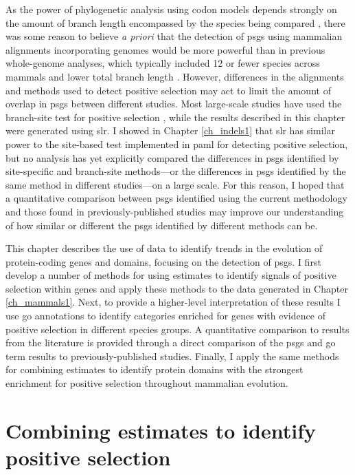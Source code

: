 As the power of phylogenetic analysis using codon models depends
strongly on the amount of branch length encompassed by the species
being compared \citep{Anisimova2001,Anisimova2002}, there was some
reason to believe \emph{a priori} that the detection of \acp{psg}
using mammalian alignments incorporating \lcv genomes would be more
powerful than in previous whole-genome analyses, which typically
included 12 or fewer species across mammals and lower total branch
length \citep{Ellegren2008}. However, differences in the alignments
and methods used to detect positive selection may act to limit the
amount of overlap in \acp{psg} between different studies. Most
large-scale studies have used the branch-site test for positive
selection \citep{Zhang2005}, while the results described in this
chapter were generated using \ac{slr}. I showed in Chapter
\ref{ch_indels1} that \ac{slr} has similar power to the site-based
test implemented in \acs{paml} for detecting \sw positive selection,
but no analysis has yet explicitly compared the differences in
\acp{psg} identified by site-specific and branch-site methods---or the
differences in \acp{psg} identified by the same method in different
studies---on a large scale. For this reason, I hoped that a
quantitative comparison between \acp{psg} identified using the current
methodology and those found in previously-published studies may
improve our understanding of how similar or different the \acp{psg}
identified by different methods can be.

This chapter describes the use of \sw data to identify trends in the
evolution of protein-coding genes and domains, focusing on the
detection of \acp{psg}. I first develop a number of methods for using
\sw estimates to identify signals of positive selection within genes
and apply these methods to the \sw data generated in Chapter
\ref{ch_mammals1}. Next, to provide a higher-level interpretation of
these results I use \ac{go} annotations \citep{Ashburner2000} to
identify categories enriched for genes with evidence of positive
selection in different species groups. A quantitative comparison to
results from the literature is provided through a direct comparison of
the \acp{psg} and \ac{go} term results to previously-published
studies. Finally, I apply the same methods for combining \sw estimates
to identify protein domains with the strongest enrichment for positive
selection throughout mammalian evolution.

\section{Combining \sw estimates to identify positive selection}
\label{sec_combining_sites}

